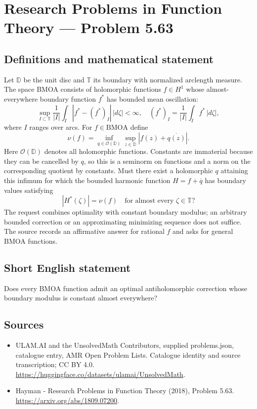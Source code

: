\documentclass[11pt,a4paper]{article}
\begin{document}
\section*{Research Problems in Function Theory — Problem 5.63}\label{statement}

\subsection{Definitions and mathematical statement}
Let $\mathbb D$ be the unit disc and $\mathbb T$ its boundary with normalized arclength measure. The space BMOA consists of holomorphic functions $f\in H^1$ whose almost-everywhere boundary function $f^*$ has bounded mean oscillation:
\[
\sup_{I\subset\mathbb T}\frac1{|I|}\int_I|f^*-(f^*)_I|\,|d\zeta|<\infty,
\quad (f^*)_I=\frac1{|I|}\int_I f^*\,|d\zeta|,
\]
where $I$ ranges over arcs. For $f\in\mathrm{BMOA}$ define
\[
\nu(f)=\inf_{q\in\mathcal O(\mathbb D)}
\sup_{z\in\mathbb D}|f(z)+\overline{q(z)}|.
\]
Here $\mathcal O(\mathbb D)$ denotes all holomorphic functions. Constants are immaterial because they can be cancelled by $q$, so this is a seminorm on functions and a norm on the corresponding quotient by constants.
Must there exist a holomorphic $q$ attaining this infimum for which the bounded harmonic function $H=f+\overline q$ has boundary values satisfying
\[
|H^*(\zeta)|=\nu(f)\quad\text{for almost every }\zeta\in\mathbb T?
\]
The request combines optimality with constant boundary modulus; an arbitrary bounded correction or an approximating minimizing sequence does not suffice. The source records an affirmative answer for rational $f$ and asks for general BMOA functions.
\subsection{Short English statement}
Does every BMOA function admit an optimal antiholomorphic correction whose boundary modulus is constant almost everywhere?
\subsection{Sources}
\begin{itemize}
\item[S1] ULAM.AI and the UnsolvedMath Contributors, supplied problems.json, catalogue entry, AMR Open Problem Lists. Catalogue identity and source transcription; CC BY 4.0.
\url{https://huggingface.co/datasets/ulamai/UnsolvedMath}.
\item[S2] Hayman - Research Problems in Function Theory (2018), Problem 5.63. 
\url{https://arxiv.org/abs/1809.07200}.
\end{itemize}
\end{document}
